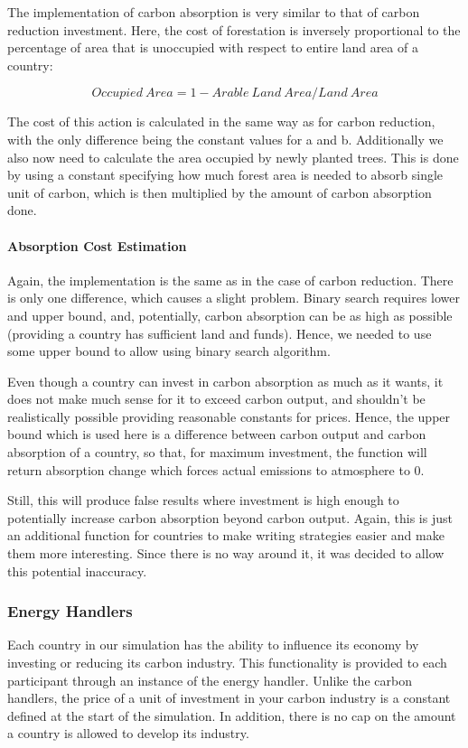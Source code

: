The implementation of carbon absorption is very similar to that of carbon reduction investment. Here, the cost of forestation is inversely proportional to the percentage of area that is unoccupied with respect to entire land area of a country:

$$
Occupied~Area= 1 - Arable~Land~Area / Land~Area
$$

The cost of this action is calculated in the same way as for carbon reduction, with the only difference being the constant values for a and b. Additionally we also now need to calculate the area occupied by newly planted trees. This is done by using a constant specifying how much forest area is needed to absorb single unit of carbon, which is then multiplied by the amount of carbon absorption done.

\paragraph{Absorption Cost Estimation}

Again, the implementation is the same as in the case of carbon reduction. There is only one difference, which causes a slight problem. Binary search requires lower and upper bound, and, potentially, carbon absorption can be as high as possible (providing a country has sufficient land and funds). Hence, we needed to use some upper bound to allow using binary search algorithm.

Even though a country can invest in carbon absorption as much as it wants, it does not make much sense for it to exceed carbon output, and shouldn't be realistically possible providing reasonable constants for prices. Hence, the upper bound which is used here is a difference between carbon output and carbon absorption of a country, so that, for maximum investment, the function will return absorption change which forces actual emissions to atmosphere to 0.

Still, this will produce false results where investment is high enough to potentially increase carbon absorption beyond carbon output. Again, this is just an additional function for countries to make writing strategies easier and make them more interesting. Since there is no way around it, it was decided to allow this potential inaccuracy.

\subsubsection{Energy Handlers}

Each country in our simulation has the ability to influence its economy by investing or reducing its carbon industry. This functionality is provided to each participant through an instance of the energy handler. Unlike the carbon handlers, the price of a unit of investment in your carbon industry is a constant defined at the start of the simulation. In addition, there is no cap on the amount a country is allowed to develop its industry. 

